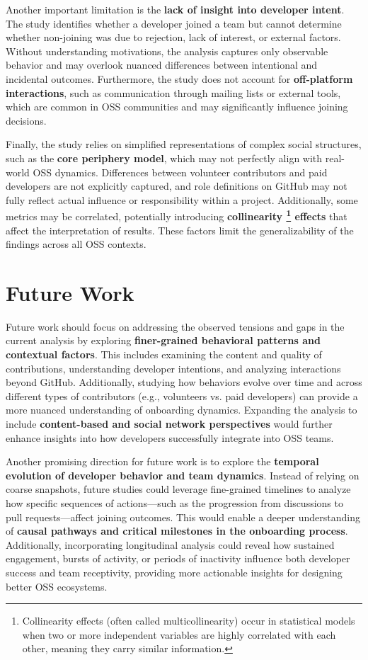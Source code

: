 Another important limitation is the \textbf{lack of insight into developer intent}. The study identifies whether a developer joined a team but cannot determine whether non-joining was due to rejection, lack of interest, or external factors. Without understanding motivations, the analysis captures only observable behavior and may overlook nuanced differences between intentional and incidental outcomes. Furthermore, the study does not account for \textbf{off-platform interactions}, such as communication through mailing lists or external tools, which are common in OSS communities and may significantly influence joining decisions.

Finally, the study relies on simplified representations of complex social structures, such as the \textbf{core periphery model}, which may not perfectly align with real-world OSS dynamics. Differences between volunteer contributors and paid developers are not explicitly captured, and role definitions on GitHub may not fully reflect actual influence or responsibility within a project. Additionally, some metrics may be correlated, potentially introducing \textbf{collinearity \footnote{Collinearity effects (often called multicollinearity) occur in statistical models when two or more independent variables are highly correlated with each other, meaning they carry similar information.} effects} that affect the interpretation of results. These factors limit the generalizability of the findings across all OSS contexts.

\section{Future Work}
Future work should focus on addressing the observed tensions and gaps in the current analysis by exploring \textbf{finer-grained behavioral patterns and contextual factors}. This includes examining the content and quality of contributions, understanding developer intentions, and analyzing interactions beyond GitHub. Additionally, studying how behaviors evolve over time and across different types of contributors (e.g., volunteers vs. paid developers) can provide a more nuanced understanding of onboarding dynamics. Expanding the analysis to include \textbf{content-based and social network perspectives} would further enhance insights into how developers successfully integrate into OSS teams.

Another promising direction for future work is to explore the \textbf{temporal evolution of developer behavior and team dynamics}. Instead of relying on coarse snapshots, future studies could leverage fine-grained timelines to analyze how specific sequences of actions—such as the progression from discussions to pull requests—affect joining outcomes. This would enable a deeper understanding of \textbf{causal pathways and critical milestones in the onboarding process}. Additionally, incorporating longitudinal analysis could reveal how sustained engagement, bursts of activity, or periods of inactivity influence both developer success and team receptivity, providing more actionable insights for designing better OSS ecosystems.


